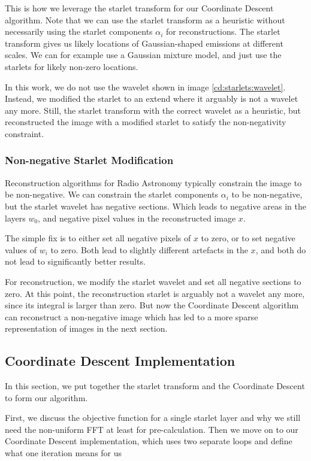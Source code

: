 This is how we  leverage the starlet transform for our Coordinate Descent algorithm. Note that we can use the starlet transform as a heuristic without necessarily using the starlet components $\alpha_i$ for reconstructions. The starlet transform gives us likely locations of Gaussian-shaped emissions at different scales. We can for example use a Gaussian mixture model, and just use the starlets for likely non-zero locations. 

In this work, we do not use the wavelet shown in image \ref{cd:starlets:wavelet}. Instead, we modified the starlet to an extend where it arguably is not a wavelet any more. Still, the starlet transform with the correct wavelet as a heuristic, but reconstructed the image with a modified starlet to satisfy the non-negativity constraint. 


\subsubsection{Non-negative Starlet Modification}
Reconstruction algorithms for Radio Astronomy typically constrain the image to be non-negative\cite{mcewen2011compressed}. We can constrain the starlet components $\alpha_i$ to be non-negative, but the starlet wavelet has negative sections. Which leads to negative areas in the layers $w_0$, and negative pixel values in the reconstructed image $x$.

The simple fix is to either set all negative pixels of $x$ to zero, or to set negative values of $w_i$ to zero. Both lead to slightly different artefacts in the $x$, and both do not lead to significantly better results.

For reconstruction, we modify the starlet wavelet and set all negative sections to zero. At this point, the reconstruction starlet is arguably not a wavelet any more, since its integral is larger than zero. But now the Coordinate Descent algorithm can reconstruct a non-negative image which has led to a more sparse representation of images in the next section.



\subsection{Coordinate Descent Implementation}
In this section, we put together the starlet transform and the Coordinate Descent to form our algorithm. 

First, we discuss the objective function for a single starlet layer and why we still need the non-uniform FFT at least for pre-calculation. Then we move on to our Coordinate Descent implementation, which uses two separate loops and define what one iteration means for us

